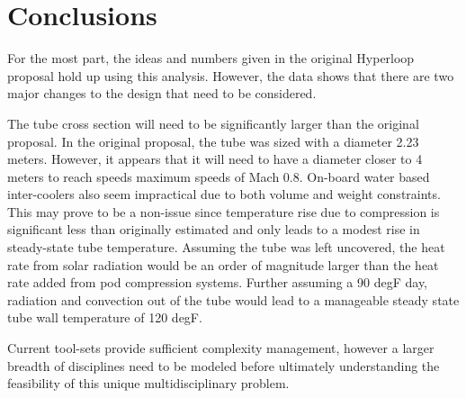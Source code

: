\documentclass[heading.tex]{subfiles}
\begin{document}
\section{Conclusions}
For the most part, the ideas and numbers given in the original Hyperloop proposal hold up using this analysis. However, the data shows that
there are two major changes to the design that need to be considered.

The tube cross section will need to be significantly larger than the original proposal. In the original proposal, the tube was sized with a diameter 2.23
meters. However, it appears that it will need to have a diameter closer to 4 meters to reach speeds maximum speeds of Mach 0.8.
On-board water based inter-coolers also seem impractical due to both volume and weight constraints. This may prove to be a non-issue since
temperature rise due to compression is significant less than originally estimated and only leads to a modest rise in steady-state tube
temperature. Assuming the tube was left uncovered, the heat rate from solar radiation would be an order of magnitude larger than the heat
rate added from pod compression systems. Further assuming a 90 degF day, radiation and convection out of the tube would lead to a
manageable steady state tube wall temperature of 120 degF.

Current tool-sets provide sufficient complexity management, however a larger breadth of disciplines need to be modeled before ultimately understanding
the feasibility of this unique multidisciplinary problem.

\end{document}

